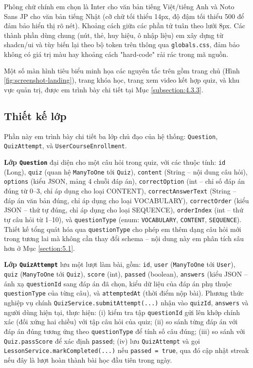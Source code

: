 \documentclass[../DoAn.tex]{subfiles}
\begin{document}
Phông chữ chính em chọn là Inter cho văn bản tiếng Việt/tiếng Anh và Noto Sans JP cho văn bản tiếng Nhật (cỡ chữ tối thiểu 14px, độ đậm tối thiểu 500 để đảm bảo hiển thị rõ nét). Khoảng cách giữa các phần tử tuân theo lưới 8px. Các thành phần dùng chung (nút, thẻ, huy hiệu, ô nhập liệu) em xây dựng từ shadcn/ui và tùy biến lại theo bộ token trên thông qua \texttt{globals.css}, đảm bảo không có giá trị màu hay khoảng cách "hard-code" rải rác trong mã nguồn.

Một số màn hình tiêu biểu minh họa các nguyên tắc trên gồm trang chủ (Hình \ref{fig:screenshot-landing}), trang khóa học, trang xem video kết hợp quiz, và khu vực quản trị, được em trình bày chi tiết tại Mục \ref{subsection:4.3.3}.

\subsection{Thiết kế lớp}
\label{subsection:4.2.2}

Phần này em trình bày chi tiết ba lớp chủ đạo của hệ thống: \texttt{Question}, \texttt{QuizAttempt}, và \texttt{UserCourseEnrollment}.

\textbf{Lớp \texttt{Question}} đại diện cho một câu hỏi trong quiz, với các thuộc tính: \texttt{id} (Long), \texttt{quiz} (quan hệ \texttt{ManyToOne} tới \texttt{Quiz}), \texttt{content} (String -- nội dung câu hỏi), \texttt{options} (kiểu JSON, mảng 4 chuỗi đáp án), \texttt{correctOption} (int -- chỉ số đáp án đúng từ 0--3, chỉ áp dụng cho loại CONTENT), \texttt{correctAnswerText} (String -- đáp án văn bản đúng, chỉ áp dụng cho loại VOCABULARY), \texttt{correctOrder} (kiểu JSON -- thứ tự đúng, chỉ áp dụng cho loại SEQUENCE), \texttt{orderIndex} (int -- thứ tự câu hỏi từ 1--10), và \texttt{questionType} (enum: \texttt{VOCABULARY}, \texttt{CONTENT}, \texttt{SEQUENCE}). Thiết kế tổng quát hóa qua \texttt{questionType} cho phép em thêm dạng câu hỏi mới trong tương lai mà không cần thay đổi schema -- nội dung này em phân tích sâu hơn ở Mục \ref{section:5.1}.

\textbf{Lớp \texttt{QuizAttempt}} lưu một lượt làm bài, gồm: \texttt{id}, \texttt{user} (\texttt{ManyToOne} tới \texttt{User}), \texttt{quiz} (\texttt{ManyToOne} tới \texttt{Quiz}), \texttt{score} (int), \texttt{passed} (boolean), \texttt{answers} (kiểu JSON -- ánh xạ \texttt{questionId} sang đáp án đã chọn, kiểu dữ liệu của đáp án phụ thuộc \texttt{questionType} của từng câu), và \texttt{attemptedAt} (thời điểm nộp bài). Phương thức nghiệp vụ chính \texttt{QuizService.submitAttempt(...)} nhận vào \texttt{quizId}, \texttt{answers} và người dùng hiện tại, thực hiện: (i) kiểm tra tập \texttt{questionId} gửi lên khớp chính xác (đối xứng hai chiều) với tập câu hỏi của quiz; (ii) so sánh từng đáp án với đáp án đúng tương ứng theo \texttt{questionType} để tính số câu đúng; (iii) so sánh với \texttt{Quiz.passScore} để xác định \texttt{passed}; (iv) lưu \texttt{QuizAttempt} và gọi \texttt{LessonService.markCompleted(...)} nếu \texttt{passed = true}, qua đó cập nhật streak nếu đây là lượt hoàn thành bài học đầu tiên trong ngày.
\end{document}
